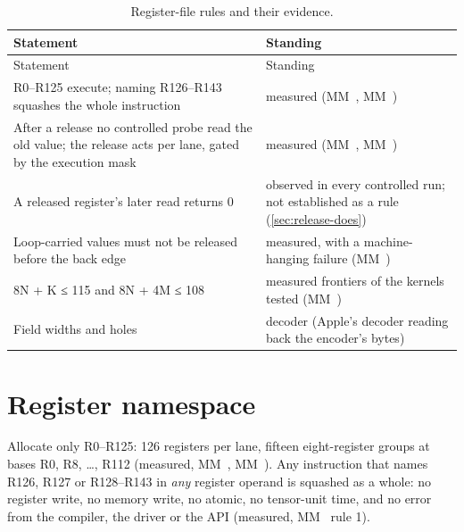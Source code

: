 \begin{xltabular}{\linewidth}{@{}XX@{}}
\caption{Register-file rules and their evidence.}\label{tab:register-statements}\\
\toprule
Statement & Standing \\
\midrule
\endfirsthead
{}
\toprule
Statement & Standing \\
\midrule
\endhead
R0–R125 execute; naming R126–R143 squashes the whole instruction & measured (MM~, MM~) \\*
After a release no controlled probe read the old value; the release acts per lane, gated by
the execution mask & measured (MM~, MM~) \\*
A released register's later read returns 0 & observed in every controlled run; not established as a rule
(\cref{sec:release-does}) \\*
Loop-carried values must not be released before the back edge & measured, with a machine-hanging failure (MM~) \\*
8N + K ≤ 115 and 8N + 4M ≤ 108 & measured frontiers of the kernels tested (MM~) \\*
Field widths and holes & decoder (Apple's decoder reading back the
encoder's bytes) \\*
\bottomrule
\end{xltabular}

\section{Register namespace}\label{sec:namespace}

Allocate only R0–R125: 126 registers per lane, fifteen eight-register groups at bases R0, R8, \dots{}, R112
(measured, MM~, MM~). Any instruction that names R126, R127 or R128–R143 in \emph{any} register operand is squashed as a
whole: no register write, no memory write, no atomic, no tensor-unit time, and no error from the compiler, the driver
or the API (measured, MM~ rule 1).

